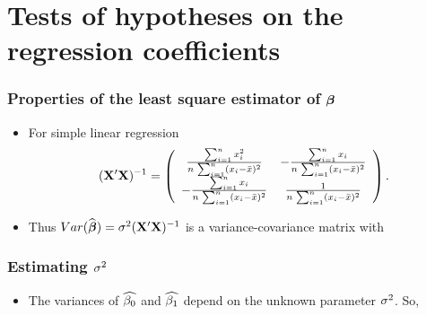 \documentclass{beamer}
\begin{document}
\section{Tests of hypotheses on the regression coefficients}
\begin{frame}\frametitle{Properties of the least square estimator of  $\mbox{\boldmath $\beta$}$}
\begin{itemize}
\item For simple linear regression
$$
({\bf X}'{\bf X})^{-1} = \left ( \begin{array}{cc} \frac{\sum_{i=1}^n x_i^2}{n\,\sum_{i=1}^n(x_i - \bar{x})^2} & - \frac{\sum_{i=1}^n x_i}{n\,\sum_{i=1}^n (x_i - \bar{x})^2} \\ - \frac{\sum_{i=1}^n x_i}{n\,\sum_{i=1}^n (x_i - \bar{x})^2} & \frac{1}{n\,\sum_{i=1}^n (x_i - \bar{x})^2} \end{array} \right ).
$$
\item Thus $Var(\widehat{\mbox{\boldmath $\beta$}}) = \sigma^2({\bf X}'{\bf X})^{-1}$ is a variance-covariance matrix with
\end{itemize}
\end{frame}

\begin{frame}\frametitle{Estimating $\sigma^2$}
\begin{itemize}
\item The variances of $\widehat{\beta_0}$ and $\widehat{\beta_1}$ depend on the unknown parameter $\sigma^2$. So, 

\end{itemize}
\end{frame}
\end{document}
